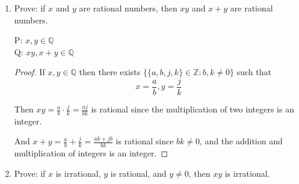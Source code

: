 \documentclass{article} %
\theoremstyle{plain}
\newtheorem*{theorem*}{Theorem}
\theoremstyle{definition}
\theoremstyle{case}
\begin{document}
\begin{enumerate}[label={\fbox{\textbf{Exercise \#\arabic* :}}}]
\begin{theorem*}
 \end{theorem*}

  \begin{proof}
    \underline{Base Case: } 
    \begin{align*}
      2^4 &= 16 \geq a_4 = a_3 + a_2 + a_1 = 8 + 4 + 2 = 14\\
      2^5 &= 32 \geq a_5 = a_4 + a_3 + a_2 = 14 + 8 + 4 = 26 \\
      2^6 &= 64 \geq a_6 = a_5 + a_4 + a_3  = 26 + 14 + 8 = 48
    \end{align*}

    \underline{Induction Step: } Let's assume the hypothesis holds for
    k:
    \begin{align*}
      2^{k-2} &\geq a_{k-2} = a_{k-3} + a_{k-4} + a_{k-5} \\
      2^{k-1} &\geq a_{k-1} = a_{k-2} + a_{k-3} + a_{k-4} \\
      2^{k} &\geq a_{k} = a_{k-1} + a_{k-2} + a_{k-3}
    \end{align*}
    So we need to show that
    \[ 2^{k+1} \geq a_{k} + a_{k-1} + a_{k-2} \]
    Subtracting $2^k$ from both sides we get
    \[ 2^{k+1} - 2^k \geq a_{k} + a_{k-1} + a_{k-2} -2^k \]
    \[ 2^k \geq a_{k} + a_{k-1} + a_{k-2} - 2^k\]
    But we know that $2^k \geq a_{k} + a_{k-1} + a_{k-2} $ so
    \[ 2^k \geq 0 \geq a_{k} + a_{k-1} + a_{k-2} - 2^k\]

  \end{proof}
  

\newpage
\item Prove: if $x$ and $y$ are rational numbers, then $xy$ and $x+y$ are rational numbers. 

P: $x, y \in \mathbb{Q}$\\
Q: $xy, x+y \in \mathbb{Q}$

\begin{proof}

  If $x, y \in \mathbb{Q} $ then there exists $\{ \{a,b,j,k\} \in \mathbb{Z}: b,k \neq 0 \}$
such that 
  \[x = \frac{a}{b}, y = \frac{j}{k} \]

  Then $xy = \frac{a}{b} \cdot \frac{j}{k} = \frac{aj}{bk} $ is rational
  since the multiplication of two integers is an integer.

  And $x+y = \frac{a}{b} + \frac{j}{k} = \frac{ak + jb}{bk}$ is
  rational since $bk \neq 0$, and the addition and multiplication 
  of integers is an integer.
\end{proof} 

\newpage
\item Prove: if $x$ is irrational, $y$ is rational, and $y \neq 0$, then $xy$ is irrational. 



\end{enumerate}
\end{document}

